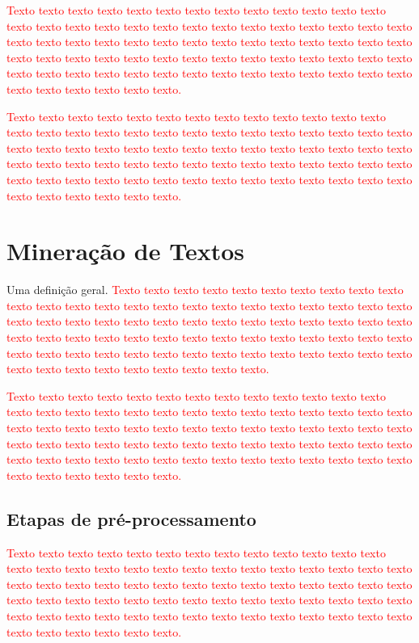 \documentclass[normaltoc, espacoumemeio, pnumromarab,ruledheader]{abnt}
\begin{document}
\textcolor{red}{Texto texto texto texto texto texto texto texto texto texto texto texto texto texto texto texto texto texto texto texto texto texto texto texto texto texto texto texto texto texto texto texto texto texto texto texto texto texto texto texto texto texto texto texto texto texto texto texto texto texto texto texto texto texto texto texto texto texto texto texto texto texto texto texto texto texto texto texto texto texto texto texto texto texto texto.}

\textcolor{red}{Texto texto texto texto texto texto texto texto texto texto texto texto texto texto texto texto texto texto texto texto texto texto texto texto texto texto texto texto texto texto texto texto texto texto texto texto texto texto texto texto texto texto texto texto texto texto texto texto texto texto texto texto texto texto texto texto texto texto texto texto texto texto texto texto texto texto texto texto texto texto texto texto texto texto texto.}
		
\section{Mineração de Textos}

Uma definição geral. \textcolor{red}{Texto texto texto texto texto texto texto texto texto texto texto texto texto texto texto texto texto texto texto texto texto texto texto texto texto texto texto texto texto texto texto texto texto texto texto texto texto texto texto texto texto texto texto texto texto texto texto texto texto texto texto texto texto texto texto texto texto texto texto texto texto texto texto texto texto texto texto texto texto texto texto texto texto texto texto.}

\textcolor{red}{Texto texto texto texto texto texto texto texto texto texto texto texto texto texto texto texto texto texto texto texto texto texto texto texto texto texto texto texto texto texto texto texto texto texto texto texto texto texto texto texto texto texto texto texto texto texto texto texto texto texto texto texto texto texto texto texto texto texto texto texto texto texto texto texto texto texto texto texto texto texto texto texto texto texto texto.}

	 \subsection{Etapas de pré-processamento}
	
	\textcolor{red}{Texto texto texto texto texto texto texto texto texto texto texto texto texto texto texto texto texto texto texto texto texto texto texto texto texto texto texto texto texto texto texto texto texto texto texto texto texto texto texto texto texto texto texto texto texto texto texto texto texto texto texto texto texto texto texto texto texto texto texto texto texto texto texto texto texto texto texto texto texto texto texto texto texto texto texto.}
	
\end{document}
